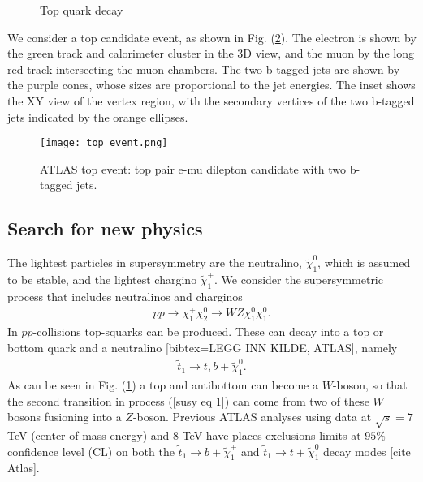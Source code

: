 \documentclass[11pt]{article}
\begin{document}
\begin{multicols}{2}
\begin{flushleft}
\begin{figure}[H]
\centering
{}
\caption{Top quark decay}
\label{fig::top quark decay}
\end{figure}
We consider a top candidate event, as shown in Fig. (\ref{fig:: top event ATLAS}). The electron is shown by the green track and calorimeter cluster in the 3D view, and the muon by the long red track intersecting the muon chambers. The two b-tagged jets are shown by the purple cones, whose sizes are proportional to the jet energies. The inset shows the XY view of the vertex region, with the secondary vertices of the two b-tagged jets indicated by the orange ellipses.
\begin{figure}[H]
\centering
\texttt{[image: top\_event.png]}
\caption{ATLAS top event: top pair e-mu dilepton candidate with two b-tagged jets.}
\label{fig:: top event ATLAS}
\end{figure}
\end{flushleft}



\subsection*{Search for new physics}
\begin{flushleft}
The lightest particles in supersymmetry are the neutralino, $\tilde{\chi}_1^0$, which is assumed to be stable, and the lightest chargino $\tilde{\chi}_1^{\pm}$. We consider the supersymmetric process that includes neutralinos and charginos
\begin{align}\label{susy eq 1}
pp \rightarrow \chi^+_1 \chi^0_2 \rightarrow WZ \chi_1^0 \chi_1^0.
\end{align}
In $pp$-collisions top-squarks can be produced. These can decay into a top or bottom quark and a neutralino [bibtex=LEGG INN KILDE, ATLAS], namely
\begin{align*}
\tilde{t}_1 \rightarrow t,b + \tilde{\chi}_1^0.
\end{align*}
As can be seen in Fig. (\ref{fig::top quark decay}) a top and antibottom can become a $W$-boson, so that the second transition in process (\ref{susy eq 1}) can come from two of these $W$ bosons fusioning into a $Z$-boson. Previous ATLAS analyses using data at $\sqrt{s}=7$ TeV (center of mass energy) and 8 TeV have places exclusions limits at $95\%$ confidence level (CL) on both the $\tilde{t}_1 \rightarrow b + \tilde{\chi}_1^{\pm}$ and $\tilde{t}_1 \rightarrow t+ \tilde{\chi}_1^0$ decay modes [cite Atlas].
\end{flushleft}


\end{multicols}
\end{document}
